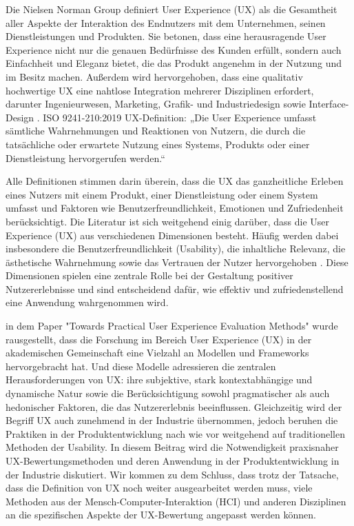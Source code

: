 \documentclass[12pt,oneside]{article}
\begin{document}
Die Nielsen Norman Group definiert User Experience (UX) als die Gesamtheit aller Aspekte der Interaktion des Endnutzers mit dem Unternehmen, seinen Dienstleistungen und Produkten. Sie betonen, dass eine herausragende User Experience nicht nur die genauen Bedürfnisse des Kunden erfüllt, 
sondern auch Einfachheit und Eleganz bietet, die das Produkt angenehm in der Nutzung und im Besitz machen. Außerdem wird hervorgehoben, dass eine qualitativ hochwertige UX eine nahtlose Integration mehrerer Disziplinen erfordert, darunter Ingenieurwesen, Marketing, Grafik- und Industriedesign sowie Interface-Design \cite{nngroup}.
ISO 9241-210:2019 UX-Definition: „Die User Experience umfasst sämtliche Wahrnehmungen und Reaktionen von Nutzern, die durch die tatsächliche oder erwartete Nutzung eines Systems, Produkts oder einer Dienstleistung hervorgerufen werden.“
\cite{ISO}

Alle Definitionen stimmen darin überein, dass die UX das ganzheitliche Erleben eines Nutzers mit einem Produkt, einer Dienstleistung oder einem System umfasst und Faktoren wie Benutzerfreundlichkeit, Emotionen und Zufriedenheit berücksichtigt.
Die Literatur ist sich weitgehend einig darüber, dass die User Experience (UX) aus verschiedenen Dimensionen besteht. Häufig werden dabei insbesondere die Benutzerfreundlichkeit (Usability), die inhaltliche Relevanz, die ästhetische Wahrnehmung sowie das Vertrauen der Nutzer hervorgehoben \cite{toolbox}.
 Diese Dimensionen spielen eine zentrale Rolle bei der Gestaltung positiver Nutzererlebnisse und sind entscheidend dafür, wie effektiv und zufriedenstellend eine Anwendung wahrgenommen wird.

in dem Paper "Towards Practical User Experience Evaluation Methods" \cite{evaluationmethods} wurde rausgestellt, dass die Forschung im Bereich User Experience (UX) in der akademischen Gemeinschaft eine Vielzahl an Modellen und Frameworks hervorgebracht hat. 
Und diese Modelle adressieren die zentralen Herausforderungen von UX: ihre subjektive, stark kontextabhängige und dynamische Natur sowie die Berücksichtigung sowohl pragmatischer als auch hedonischer Faktoren, die das Nutzererlebnis beeinflussen. Gleichzeitig wird der Begriff UX auch zunehmend in der Industrie übernommen,
 jedoch beruhen die Praktiken in der Produktentwicklung nach wie vor weitgehend auf traditionellen Methoden der Usability. In diesem Beitrag wird die Notwendigkeit praxisnaher UX-Bewertungsmethoden und deren Anwendung in der Produktentwicklung in der Industrie diskutiert. Wir kommen zu dem Schluss, dass trotz der Tatsache,
 dass die Definition von UX noch weiter ausgearbeitet werden muss, viele Methoden aus der Mensch-Computer-Interaktion (HCI) und anderen Disziplinen an die spezifischen Aspekte der UX-Bewertung angepasst werden können.  \cite{evaluationmethods}
\end{document}
